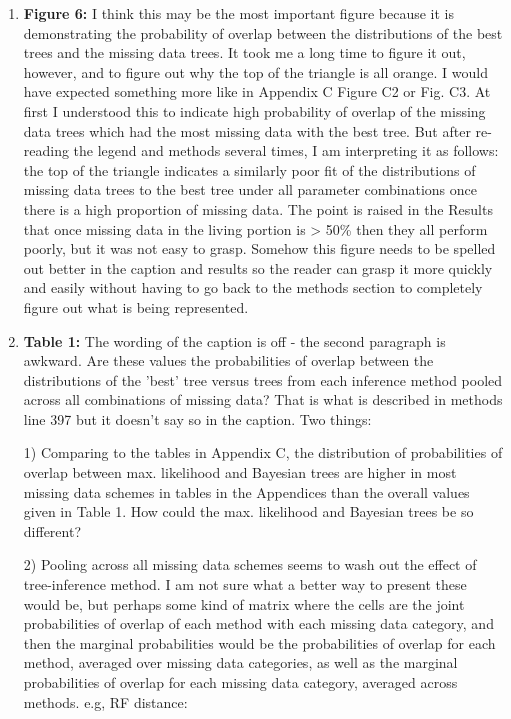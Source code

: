 \documentclass[12pt,letterpaper]{article}
\begin{document}
\begin{enumerate}
\item{\textbf{Figure 6:}} I think this may be the most important figure because it is demonstrating the probability of overlap between the distributions of the best trees and the missing data trees. It took me a long time to figure it out, however, and to figure out why the top of the triangle is all orange. I would have expected something more like in Appendix C Figure C2 or Fig. C3. At first I understood this to indicate high probability of overlap of the missing data trees which had the most missing data with the best tree. But after re-reading the legend and methods several times, I am interpreting it as follows: the top of the triangle indicates a similarly poor fit of the distributions of missing data trees to the best tree under all parameter combinations once there is a high proportion of missing data. The point is raised in the Results that once missing data in the living portion is > 50\% then they all perform poorly, but it was not easy to grasp. Somehow this figure needs to be spelled out better in the caption and results so the reader can grasp it more quickly and easily without having to go back to the methods section to completely figure out what is being represented.

\item{\textbf{Table 1:}} The wording of the caption is off - the second paragraph is awkward. 
Are these values the probabilities of overlap between the distributions of the 'best' tree versus trees from each inference method pooled across all combinations of missing data? That is what is described in methods line 397 but it doesn't say so in the caption. Two things:

1)  Comparing to the tables in Appendix C, the distribution of probabilities of overlap between max. likelihood and Bayesian trees are higher in most missing data schemes in tables in the Appendices than the overall values given in Table 1. How could the max. likelihood and Bayesian trees be so different? 

2)  Pooling across all missing data schemes seems to wash out the effect of tree-inference method. I am not sure what a better way to present these would be, but perhaps some kind of matrix where the cells are the joint probabilities of overlap of each method with each missing data category, and then the marginal probabilities would be the probabilities of overlap for each method, averaged over missing data categories, as well as the marginal probabilities of overlap for each missing data category, averaged across methods. 
e.g, RF distance:


\end{enumerate}
\end{document}
